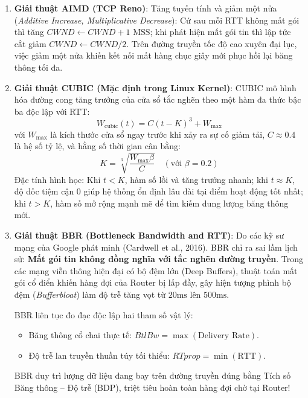 \begin{enumerate}
  \item \textbf{Giải thuật AIMD (TCP Reno)}: Tăng tuyến tính và giảm một nửa (\textit{Additive Increase, Multiplicative Decrease}): Cứ sau mỗi RTT không mất gói thì tăng $CWND \leftarrow CWND + 1\text{ MSS}$; khi phát hiện mất gói tin thì lập tức cắt giảm $CWND \leftarrow CWND / 2$. Trên đường truyền tốc độ cao xuyên đại lục, việc giảm một nửa khiến kết nối mất hàng chục giây mới phục hồi lại băng thông tối đa.

  \item \textbf{Giải thuật CUBIC (Mặc định trong Linux Kernel)}:
  CUBIC mô hình hóa đường cong tăng trưởng của cửa sổ tắc nghẽn theo một hàm đa thức bậc ba độc lập với RTT:
  \begin{equation}
  W_{\text{cubic}}(t) = C (t - K)^3 + W_{\max}
  \end{equation}
  với $W_{\max}$ là kích thước cửa sổ ngay trước khi xảy ra sự cố giảm tải, $C \approx 0.4$ là hệ số tỷ lệ, và hằng số thời gian cân bằng:
  \begin{equation}
  K = \sqrt[3]{\frac{W_{\max} \beta}{C}} \quad (\text{với } \beta = 0.2)
  \end{equation}
  Đặc tính hình học: Khi $t < K$, hàm số lồi và tăng trưởng nhanh; khi $t \approx K$, độ dốc tiệm cận 0 giúp hệ thống ổn định lâu dài tại điểm hoạt động tốt nhất; khi $t > K$, hàm số mở rộng mạnh mẽ để tìm kiếm dung lượng băng thông mới.

  \item \textbf{Giải thuật BBR (Bottleneck Bandwidth and RTT)}:
  Do các kỹ sư mạng của Google phát minh (Cardwell et al., 2016). BBR chỉ ra sai lầm lịch sử: \textbf{Mất gói tin không đồng nghĩa với tắc nghẽn đường truyền}. Trong các mạng viễn thông hiện đại có bộ đệm lớn (Deep Buffers), thuật toán mất gói cổ điển khiến hàng đợi của Router bị lấp đầy, gây hiện tượng phình bộ đệm (\textit{Bufferbloat}) làm độ trễ tăng vọt từ $20\text{ms}$ lên $500\text{ms}$.
  
  BBR liên tục đo đạc độc lập hai tham số vật lý:
  \begin{itemize}
    \item Băng thông cổ chai thực tế: $BtlBw = \max(\text{Delivery Rate})$.
    \item Độ trễ lan truyền thuần túy tối thiểu: $RTprop = \min(\text{RTT})$.
  \end{itemize}
  BBR duy trì lượng dữ liệu đang bay trên đường truyền đúng bằng Tích số Băng thông -- Độ trễ (BDP), triệt tiêu hoàn toàn hàng đợi chờ tại Router!
\end{enumerate}


